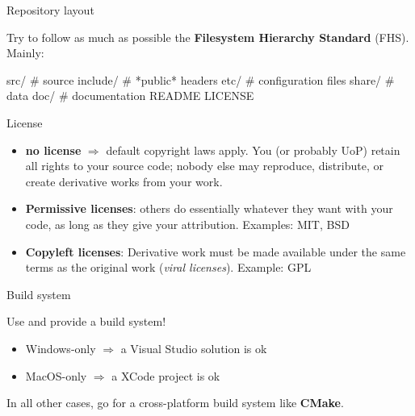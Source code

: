 \documentclass[compress]{beamer}
\begin{document}
\begin{frame}[fragile]{Repository layout}

Try to follow as much as possible the {\bf Filesystem Hierarchy
 Standard} (FHS). Mainly:

\begin{shcode}
src/        # source
include/    # *public* headers
etc/        # configuration files
share/      # data
doc/        # documentation
README
LICENSE
\end{shcode}

\centering


\end{frame}

\begin{frame}{License}
    \begin{itemize}
        \item {\bf no license} $\Rightarrow$ default copyright laws apply.
            You (or probably UoP) retain all rights to your source code; nobody else may
            reproduce, distribute, or create derivative works from your work.
        \item {\bf Permissive licenses}: others do essentially whatever they
            want with your code, as long as they give your attribution.
            Examples: MIT, BSD
        \item {\bf Copyleft licenses}: Derivative work must be made
            available under the same terms as the original work (\emph{viral
            licenses}). Example: GPL
    \end{itemize}

    \centering



\end{frame}

\begin{frame}{Build system}

    Use and provide a build system!

    \begin{itemize}
        \item Windows-only $\Rightarrow$ a Visual Studio solution is ok
        \item MacOS-only $\Rightarrow$ a XCode project is ok
    \end{itemize}

    In all other cases, go for a cross-platform build system like {\bf
    CMake}.
\end{frame}
\end{document}
